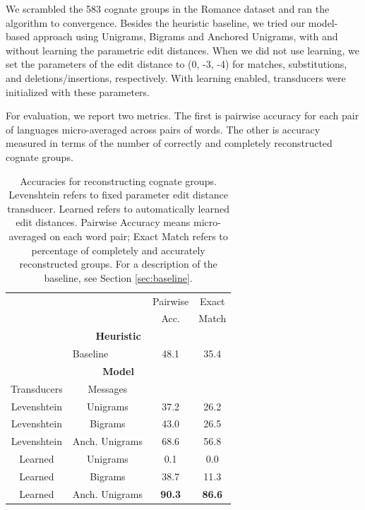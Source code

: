 \documentclass[11pt,a4paper]{article}
\begin{document}
We scrambled the 583 cognate groups in the Romance dataset and ran
the algorithm to convergence. Besides the heuristic baseline, we
tried our model-based approach using Unigrams, Bigrams and Anchored
Unigrams, with and without learning the parametric edit distances.
When we did not use learning, we set the parameters of the edit
distance to (0, -3, -4) for matches, substitutions, and
deletions/insertions, respectively. With learning enabled, transducers
were initialized with these parameters.

For evaluation, we report two metrics. The first is pairwise accuracy
for each pair of languages micro-averaged across pairs of words.
The other is accuracy measured in terms of the number of correctly
and completely reconstructed cognate groups.

\begin{table}
  \small
  { 
  \begin{tabular}{|c|c|c|c|}
    \cline{3-4} 
    \multicolumn{2}{c|}{} & Pairwise & Exact \\
    \multicolumn{2}{c|}{} & Acc. & Match \\
    \hline 
    \multicolumn{4}{|c|}{\textbf{Heuristic}} \\
    \hline
    \multicolumn{1}{|c}{} & \multicolumn{1}{l|}{Baseline} & 48.1 & 35.4  \\
    \hline
    \hline
    \multicolumn{4}{|c|}{\textbf{Model}} \\
    \hline
    Transducers & Messages & \multicolumn{2}{c}{} \\
    \hline
    Levenshtein&Unigrams & 37.2 & 26.2 \\
    Levenshtein&Bigrams & 43.0 & 26.5 \\
    Levenshtein&Anch. Unigrams & 68.6 & 56.8\\
    Learned&Unigrams & 0.1 & 0.0 \\
    Learned&Bigrams & 38.7 & 11.3 \\
    Learned&Anch. Unigrams & \textbf{90.3}  & \textbf{86.6} \\
    \hline
  \end{tabular}
  \caption{Accuracies for reconstructing cognate groups. Levenshtein
  refers to fixed parameter edit distance transducer. Learned refers
  to automatically learned edit distances. Pairwise Accuracy means micro-averaged
  on each word pair; Exact Match refers to percentage of completely and accurately
  reconstructed groups. For a description of the baseline, see Section \ref{sec:baseline}. }
  \label{tbl:exp1}
 }
\end{table}
\end{document}
